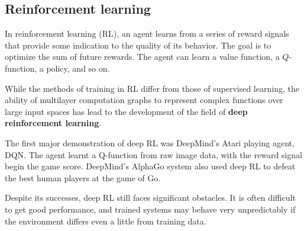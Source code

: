 \documentclass{article}
\begin{document}
\subsection{Reinforcement learning}

In reinforcement learning (RL), an agent learns from a series of
reward signals that provide some indication to the quality of its 
behavior. The goal is to optimize the sum of future rewards. The
agent can learn a value function, a $Q$-function, a policy, and so on.

While the methods of training in RL differ from those of supervised
learning, the ability of multilayer computation graphs to represent
complex functions over large input spaces has lead to the development
of the field of \textbf{deep reinforcement learning}.

The first major demonstration of deep RL was DeepMind's Atari playing
agent, DQN. The agent learnt a Q-function from raw image data, with the
reward signal begin the game score. DeepMind's AlphaGo system also
used deep RL to defeat the best human players at the game of Go.

Despite its successes, deep RL still faces significant obstacles. It is
often difficult to get good performance, and trained systems may
behave very unpredictably if the environment differs even a little
from training data.
\end{document}
